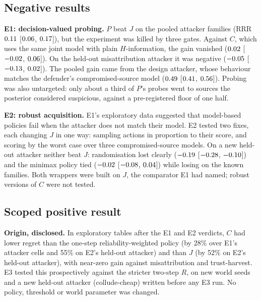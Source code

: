 \documentclass[conference]{IEEEtran}
\begin{document}
\subsection{Negative results}\label{sec:neg}

\textbf{E1: decision-valued probing.} $P$ beat $J$ on the pooled attacker families (RRR $0.11$ [$0.06$,
$0.17$]), but the experiment was killed by three gates. Against $C$, which uses the same joint model with plain
$H$-information, the gain vanished ($0.02$ [$-0.02$, $0.06$]). On the held-out misattribution attacker it was
negative ($-0.05$ [$-0.13$, $0.02$]). The pooled gain came from the design attacker, whose behaviour
matches the defender's compromised-source model ($0.49$ [$0.41$, $0.56$]). Probing was also
untargeted: only about a third of $P$'s probes went to sources the posterior considered suspicious, against a
pre-registered floor of one half.

\textbf{E2: robust acquisition.} E1's exploratory data suggested that model-based policies fail when the attacker does
not match their model. E2 tested two fixes, each changing $J$ in one way: sampling actions in proportion to their score,
and scoring by the worst case over three compromised-source models. On a new held-out attacker neither beat $J$:
randomisation lost clearly ($-0.19$ [$-0.28$, $-0.10$]) and the minimax policy tied ($-0.02$ [$-0.08$,
$0.04$]) while losing on the known families. Both wrappers were built on $J$, the comparator E1 had named; robust
versions of $C$ were not tested.

\subsection{Scoped positive result}\label{sec:pos}

\textbf{Origin, disclosed.} In exploratory tables after the E1 and E2 verdicts, $C$ had lower regret than the one-step
reliability-weighted policy (by 28\% over E1's attacker cells and 55\% on E2's held-out attacker) and than $J$ (by 52\%
on E2's held-out attacker), with near-zero gain against misattribution and trust-harvest. E3 tested this prospectively
against the stricter two-step $R$, on new world seeds and a new held-out attacker (collude-cheap) written before any E3
run. No policy, threshold or world parameter was changed.
\end{document}
